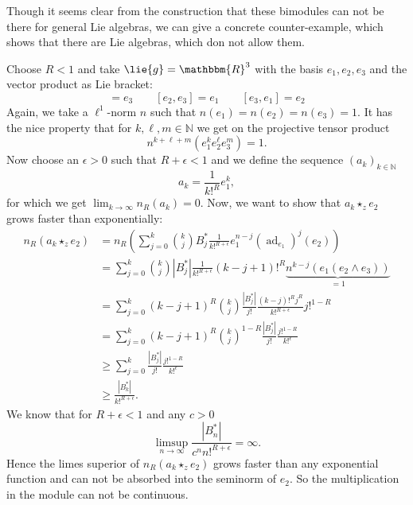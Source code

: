 Though it seems clear from the construction that these bimodules can not be 
there for general Lie algebras, we can give a concrete counter-example, which 
shows that there are Lie algebras, which don not allow them.
\begin{example}
	\label{Nilpot:Ex:NoModulesInGeneral}
	Choose $R < 1$ and take $\lie{g} = \mathbbm{R}^3$ with the basis $e_1, e_2, 
	e_3$ and the vector product as Lie bracket:
	\begin{equation*}
		[e_1, e_2] 
		= 
		e_3 
		\qquad 
		[e_2, e_3] 
		= 
		e_1 
		\qquad 
		[e_3, e_1] 
		= 
		e_2
	\end{equation*}
	Again, we take a $\ell^1$-norm $n$ such that $n(e_1) = n(e_2) = n(e_3) 
	= 1$. It has the nice property that for $k, \ell, m \in \mathbb{N}$ we get
	on the projective tensor product
	\begin{equation*}
		n^{k + \ell + m} \left(
			e_1^k e_2^{\ell} e_3^m
		\right)
		=
		1.
	\end{equation*}
	Now choose an $\epsilon > 0$ such that $R + \epsilon < 1$ and we define the 
	sequence $(a_k)_{k \in \mathbb{N}}$
	\begin{equation*}
		a_k 
		= 
		\frac{1}{k!^R} e_1^k,
	\end{equation*}
	for which we get $\lim_{k \longrightarrow \infty} n_R(a_k) = 0$. Now, we want 
	to show that $a_k \star_z e_2$ grows faster than exponentially:
	\begin{align*}
		n_R \left( a_k \star_z e_2 \right) 
		& = 
		n_R \left( 
			\sum\limits_{j = 0}^k 
			\binom{k}{j} B_j^* 
			\frac{1}{k!^{R + \epsilon}} 
			e_1^{n-j} 
			\left( 
				\operatorname{ad}_{e_1} 
			\right)^j(e_2) 
		\right)
		\\
		& =
		\sum\limits_{j = 0}^k 
		\binom{k}{j} 
		|B_j^*| 
		\frac{1}{k!^{R + \epsilon}} 
		(k-j+1)!^R 
		\underbrace{
			n^{k-j} \left( e_1 (e_2 \wedge e_3) \right)
		}_{ = 1}
		\\
		& = 
		\sum\limits_{j = 0}^k 
		(k-j+1)^R 
		\binom{k}{j}
		\frac{|B_j^*|}{j!} 
		\frac{(k-j)!^R j^R}{k!^{R + \epsilon}} 
		j!^{1-R}
		\\
		& = 
		\sum\limits_{j=0}^k 
		(k-j+1)^R 
		\binom{k}{j}^{1-R} 
		\frac{|B_j^*|}{j!} 
		\frac{j!^{1-R}}{k!^\epsilon}
		\\
		& \geq 
		\sum\limits_{j=0}^k 
		\frac{|B_j^*|}{j!} 
		\frac{j!^{1-R}}{k!^\epsilon}
		\\
		& \geq 
		\frac{|B_k^*|}{k!^{R + \epsilon}}.
	\end{align*}
	We know that for $R +\epsilon < 1$ and any $c > 0$
	\begin{equation*}
		\limsup_{n \longrightarrow \infty}
		\frac{|B_n^*|}{c^n n!^{R + \epsilon}}
		=
		\infty.
	\end{equation*}
	Hence the limes superior of $n_R \left( a_k \star_z e_2 \right) $ grows 
	faster than any exponential function and can not be absorbed into the seminorm 
	of $e_2$. So the multiplication in the module can not be continuous.
\end{example}



